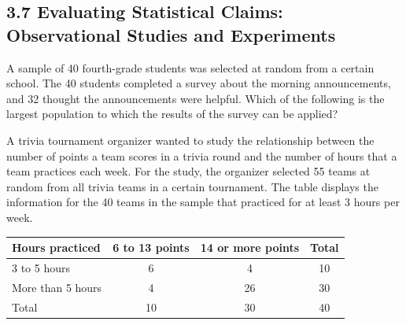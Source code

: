 \subsection*{3.7 Evaluating Statistical Claims: Observational Studies and Experiments }

\vspace{0.5em}

\setcounter{questionnum}{0}


\noindent\markforreview
\vspace{1em}

A sample of 40 fourth-grade students was selected at random from a certain school.  
The 40 students completed a survey about the morning announcements, and 32 thought the announcements were helpful.  
Which of the following is the largest population to which the results of the survey can be applied?

\vspace{0.75em}


\vspace{2em}


\newpage
\noindent\markforreview
\vspace{0.5em}

A trivia tournament organizer wanted to study the relationship between the number of points a team scores in a trivia round  
and the number of hours that a team practices each week. For the study, the organizer selected 55 teams at random  
from all trivia teams in a certain tournament. The table displays the information for the 40 teams in the sample that practiced  
for at least 3 hours per week.


\begin{center}
    

\begin{tabular}{|l|c|c|c|}
\hline
Hours practiced & 6 to 13 points & 14 or more points & Total \\
\hline
3 to 5 hours & 6 & 4 & 10 \\
More than 5 hours & 4 & 26 & 30 \\
\hline
Total & 10 & 30 & 40 \\
\hline
\end{tabular}
\end{center}


